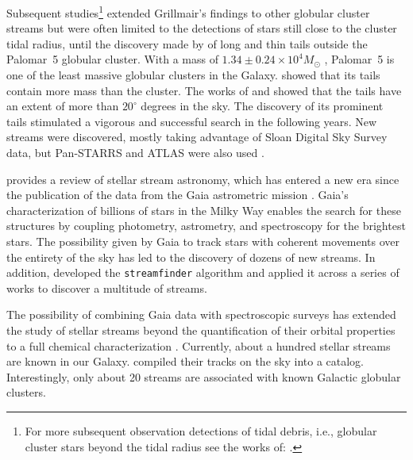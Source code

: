     Subsequent studies\footnote{For more subsequent observation detections of tidal debris, i.e., globular cluster stars beyond the tidal radius see the works of: \citet{1997A&A...320..776L, 2000A&A...356..127T, 2000A&A...359..907L, 2001AAS...19910906S, 2003AJ....126..815L,2011ApJ...726...47S,2018MNRAS.476.4814S,2020MNRAS.495.2222S}.} extended Grillmair's findings to other globular cluster streams but were often limited to the detections of stars still close to the cluster tidal radius, until the discovery made by \citet{2001ApJ...548L.165O,2002AAS...200.1001O, 2003AJ....126.2385O} of long and thin tails outside the Palomar~5 globular cluster. With a mass of $1.34\pm 0.24 \times 10^4 M_{\odot}$ \citep{2019MNRAS.482.5138B}, Palomar~5 is one of the least massive globular clusters in the Galaxy. \citet{2003AJ....126.2385O} showed that its tails contain more mass than the cluster. The works of \citet{2006ApJ...641L..37G} and \citet{2015MNRAS.446.3297K} showed that the tails have an extent of more than $20^\circ$ degrees in the sky. The discovery of its prominent tails stimulated a vigorous and successful search in the following years. New streams were discovered, mostly taking advantage of Sloan Digital Sky Survey data, but Pan-STARRS and ATLAS were also used \citep{2006ApJ...643L..17G, 2006ApJ...637L..29B, 2009ApJ...693.1118G, 2012ApJ...760L...6B, 2013ApJ...769L..23G, 2014ApJ...790L..10G, 2015ApJ...812L..26G, 2014MNRAS.443L..84B, 2016MNRAS.463.1759B, 2017ApJ...847..119G, 2014MNRAS.442L..85K}. 

    \citet{2025NewAR.10001713B} provides a review of stellar stream astronomy, which has entered a new era since the publication of the data from the Gaia astrometric mission \citep{2016A&A...595A...1G}. Gaia's characterization of billions of stars in the Milky Way enables the search for these structures by coupling photometry, astrometry, and spectroscopy for the brightest stars. The possibility given by Gaia to track stars with coherent movements over the entirety of the sky has led to the discovery of dozens of new streams. In addition, \citet{2018MNRAS.477.4063M} developed the \texttt{streamfinder} algorithm and applied it across a series of works \citep{2018MNRAS.481.3442M,  2018ApJ...865...85I, 2019ApJ...872..152I} to discover a multitude of streams.

    The possibility of combining Gaia data with spectroscopic surveys has extended the study of stellar streams beyond the quantification of their orbital properties to a full chemical characterization \citep{2019MNRAS.490.3508L, 2020AJ....160..181J, 2021ApJ...911..149L, 2022ApJ...928...30L, 2024MNRAS.529.2413U}. Currently, about a hundred stellar streams are known in our Galaxy. \citet{2023MNRAS.520.5225M} compiled their tracks on the sky into a catalog. Interestingly, only about 20 streams are associated with known Galactic globular clusters.

